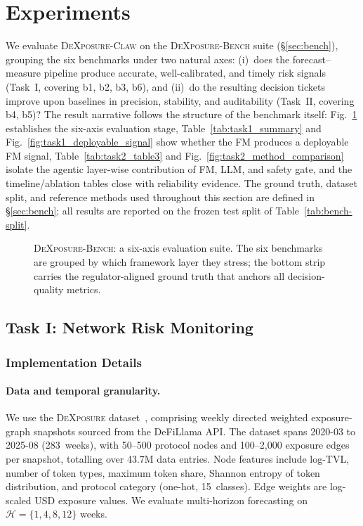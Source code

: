 \section{Experiments}
\label{sec:exp}

We evaluate \textsc{DeXposure-Claw} on the \textsc{DeXposure-Bench} suite (\S\ref{sec:bench}), grouping the six benchmarks under two natural axes: (i)~does the forecast--measure pipeline produce accurate, well-calibrated, and timely risk signals (Task~I, covering b1, b2, b3, b6), and (ii)~do the resulting decision tickets improve upon baselines in precision, stability, and auditability (Task~II, covering b4, b5)? The result narrative follows the structure of the benchmark itself: Fig.~\ref{fig:eval_framework} establishes the six-axis evaluation stage, Table~\ref{tab:task1_summary} and Fig.~\ref{fig:task1_deployable_signal} show whether the FM produces a deployable FM signal, Table~\ref{tab:task2_table3} and Fig.~\ref{fig:task2_method_comparison} isolate the agentic layer-wise contribution of FM, LLM, and safety gate, and the timeline/ablation tables close with reliability evidence. The ground truth, dataset split, and reference methods used throughout this section are defined in \S\ref{sec:bench}; all results are reported on the frozen test split of Table~\ref{tab:bench-split}.

\begin{figure}[!t]
    \centering
    \resizebox{0.95\textwidth}{!}{}
    \caption{\textsc{DeXposure-Bench}: a six-axis evaluation suite. The six benchmarks are grouped by which framework layer they stress; the bottom strip carries the regulator-aligned ground truth that anchors all decision-quality metrics.}
    \label{fig:eval_framework}
\end{figure}

\subsection{Task I: Network Risk Monitoring}

\subsubsection{Implementation Details}
\label{sssec:impl_task1}

\paragraph{Data and temporal granularity.}
We use the \textsc{DeXposure} dataset~\cite{wu2025dexposuredatasetbenchmarksinterprotocol}, comprising weekly directed weighted exposure-graph snapshots sourced from the DeFiLlama API. The dataset spans 2020-03 to 2025-08 (283~weeks), with 50--500 protocol nodes and 100--2{,}000 exposure edges per snapshot, totalling over 43.7M data entries. Node features include log-TVL, number of token types, maximum token share, Shannon entropy of token distribution, and protocol category (one-hot, 15~classes). Edge weights are log-scaled USD exposure values. We evaluate multi-horizon forecasting on $\mathcal{H}=\{1,4,8,12\}$ weeks.

